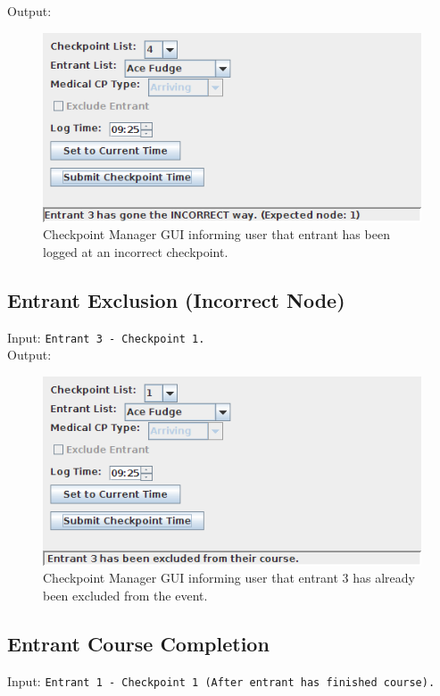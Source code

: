 \documentclass[a4paper, 10pt]{article}
\begin{document}
Output:
\begin{figure}[ht!]
\centering
\includegraphics[scale=0.7]{cm-submitincorrect.png}
\caption{Checkpoint Manager GUI informing user that entrant has been logged at an incorrect checkpoint.}
\end{figure}

\subsection{Entrant Exclusion (Incorrect Node)}

Input: \verb+Entrant 3 - Checkpoint 1.+ \\

Output:
\begin{figure}[ht!]
\centering
\includegraphics[scale=0.7]{cm-submitexclude.png}
\caption{Checkpoint Manager GUI informing user that entrant 3 has already been excluded from the event.}
\end{figure}

\clearpage
\subsection{Entrant Course Completion}

Input: \verb+Entrant 1 - Checkpoint 1 (After entrant has finished course).+ \\
\end{document}
